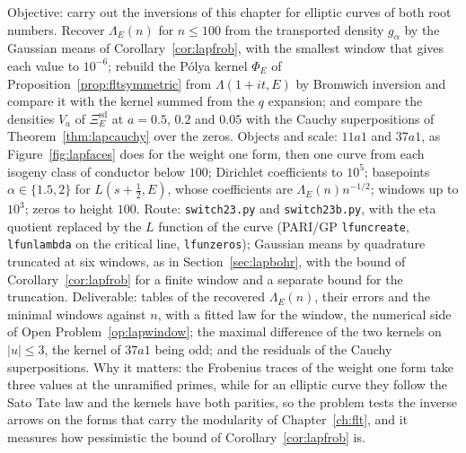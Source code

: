 \begin{compproblem}\label{cp:lapfaces}
Objective: carry out the inversions of this chapter for elliptic curves of both root numbers. Recover $\Lambda_E(n)$ for $n\le100$ from the transported density $g_\alpha$ by the Gaussian means of Corollary~\ref{cor:lapfrob}, with the smallest window that gives each value to $10^{-6}$; rebuild the P\'olya kernel $\Phi_E$ of Proposition~\ref{prop:fltsymmetric} from $\Lambda(1+it,E)$ by Bromwich inversion and compare it with the kernel summed from the $q$ expansion; and compare the densities $V_a$ of $\Xi^{\mathrm{sd}}_E$ at $a=0.5$, $0.2$ and $0.05$ with the Cauchy superpositions of Theorem~\ref{thm:lapcauchy} over the zeros. Objects and scale: $11a1$ and $37a1$, as Figure~\ref{fig:lapfaces} does for the weight one form, then one curve from each isogeny class of conductor below $100$; Dirichlet coefficients to $10^5$; basepoints $\alpha\in\{1.5,2\}$ for $L(s+\frac12,E)$, whose coefficients are $\Lambda_E(n)n^{-1/2}$; windows up to $10^3$; zeros to height $100$. Route: \texttt{switch23.py} and \texttt{switch23b.py}, with the eta quotient replaced by the $L$ function of the curve (PARI/GP \texttt{lfuncreate}, \texttt{lfunlambda} on the critical line, \texttt{lfunzeros}); Gaussian means by quadrature truncated at six windows, as in Section~\ref{sec:lapbohr}, with the bound of Corollary~\ref{cor:lapfrob} for a finite window and a separate bound for the truncation. Deliverable: tables of the recovered $\Lambda_E(n)$, their errors and the minimal windows against $n$, with a fitted law for the window, the numerical side of Open Problem~\ref{op:lapwindow}; the maximal difference of the two kernels on $|u|\le3$, the kernel of $37a1$ being odd; and the residuals of the Cauchy superpositions. Why it matters: the Frobenius traces of the weight one form take three values at the unramified primes, while for an elliptic curve they follow the Sato Tate law and the kernels have both parities, so the problem tests the inverse arrows on the forms that carry the modularity of Chapter~\ref{ch:flt}, and it measures how pessimistic the bound of Corollary~\ref{cor:lapfrob} is.
\end{compproblem}

